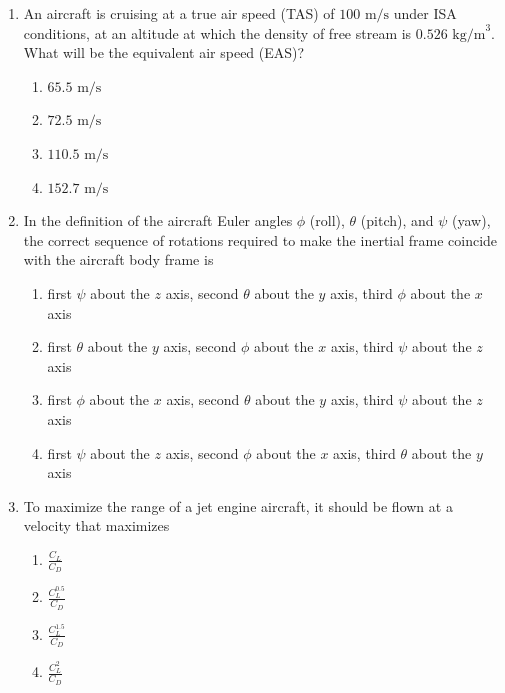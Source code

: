 \documentclass[journal]{IEEEtran}
\begin{document}
\begin{enumerate}[start=35]
\begin{enumerate}
\end{enumerate}
\item An aircraft is cruising at a true air speed (TAS) of $100 \text{ m/s}$ under ISA conditions, at an altitude at which the density of free stream is $0.526 \text{ kg/m}^3$. What will be the equivalent air speed (EAS)?
\begin{enumerate}
    \item $65.5 \text{ m/s}$
    \item $72.5 \text{ m/s}$
    \item $110.5 \text{ m/s}$
    \item $152.7 \text{ m/s}$
\end{enumerate}
\item In the definition of the aircraft Euler angles $\phi$ (roll), $\theta$ (pitch), and $\psi$ (yaw), the correct sequence of rotations required to make the inertial frame coincide with the aircraft body frame is
\begin{enumerate}
    \item  first $\psi$ about the $z$ axis, second $\theta$ about the $y$ axis, third $\phi$ about the $x$ axis
    \item  first $\theta$ about the $y$ axis, second $\phi$ about the $x$ axis, third $\psi$ about the $z$ axis
    \item  first $\phi$ about the $x$ axis, second $\theta$ about the $y$ axis, third $\psi$ about the $z$ axis
    \item  first $\psi$ about the $z$ axis, second $\phi$ about the $x$ axis, third $\theta$ about the $y$ axis
\end{enumerate}

\item To maximize the range of a jet engine aircraft, it should be flown at a velocity that maximizes
\begin{enumerate}
    \item $\frac{C_L}{C_D}$
    \item $\frac{C_{L}^{0.5}}{C_D}$
    \item $\frac{C_{L}^{1.5}}{C_D}$
    \item $\frac{C_{L}^{2}}{C_{D}}$
\end{enumerate}


\end{enumerate}
\end{document}
